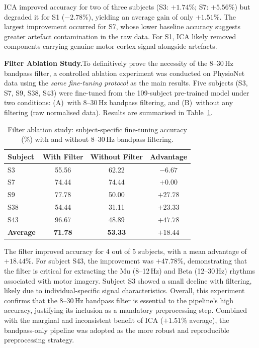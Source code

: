 \documentclass[12pt, a4paper]{article}
\begin{document}
ICA improved accuracy for two of three subjects (S3: $+1.74\%$; S7: $+5.56\%$) but degraded it for S1 ($-2.78\%$), yielding an average gain of only $+1.51\%$. The largest improvement occurred for S7, whose lower baseline accuracy suggests greater artefact contamination in the raw data. For S1, ICA likely removed components carrying genuine motor cortex signal alongside artefacts.

\textbf{Filter Ablation Study.}\quad To definitively prove the necessity of the 8--30\,Hz bandpass filter, a controlled ablation experiment was conducted on PhysioNet data using the \emph{same fine-tuning protocol} as the main results. Five subjects (S3, S7, S9, S38, S43) were fine-tuned from the 109-subject pre-trained model under two conditions: (A)~with 8--30\,Hz bandpass filtering, and (B)~without any filtering (raw normalised data). Results are summarised in Table~\ref{tab:filter_ablation}.

\begin{table}[h]
\centering
\caption{Filter ablation study: subject-specific fine-tuning accuracy (\%) with and without 8--30\,Hz bandpass filtering.}
\label{tab:filter_ablation}
\begin{tabular}{lccc}
\toprule
Subject & With Filter & Without Filter & Advantage \\
\midrule
S3  & 55.56 & 62.22 & $-6.67$ \\
S7  & 74.44 & 74.44 & $+0.00$ \\
S9  & 77.78 & 50.00 & $+27.78$ \\
S38 & 54.44 & 31.11 & $+23.33$ \\
S43 & 96.67 & 48.89 & $+47.78$ \\
\midrule
\textbf{Average} & \textbf{71.78} & \textbf{53.33} & $\mathbf{+18.44}$ \\
\bottomrule
\end{tabular}
\end{table}

The filter improved accuracy for 4 out of 5 subjects, with a mean advantage of $+18.44\%$. For subject S43, the improvement was $+47.78\%$, demonstrating that the filter is critical for extracting the Mu (8--12\,Hz) and Beta (12--30\,Hz) rhythms associated with motor imagery. Subject S3 showed a small decline with filtering, likely due to individual-specific signal characteristics. Overall, this experiment confirms that the 8--30\,Hz bandpass filter is essential to the pipeline's high accuracy, justifying its inclusion as a mandatory preprocessing step. Combined with the marginal and inconsistent benefit of ICA ($+1.51\%$ average), the bandpass-only pipeline was adopted as the more robust and reproducible preprocessing strategy.
\end{document}
